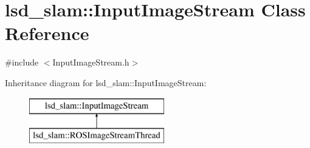 \hypertarget{classlsd__slam_1_1_input_image_stream}{\section{lsd\-\_\-slam\-:\-:Input\-Image\-Stream Class Reference}
\label{classlsd__slam_1_1_input_image_stream}
}


{\ttfamily \#include $<$Input\-Image\-Stream.\-h$>$}

Inheritance diagram for lsd\-\_\-slam\-:\-:Input\-Image\-Stream\-:\begin{figure}[H]
\begin{center}
\leavevmode
\includegraphics[height=2.000000cm]{classlsd__slam_1_1_input_image_stream}
\end{center}
\end{figure}
